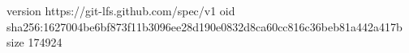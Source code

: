 version https://git-lfs.github.com/spec/v1
oid sha256:1627004be6bf873f11b3096ee28d190e0832d8ca60cc816c36beb81a442a417b
size 174924
